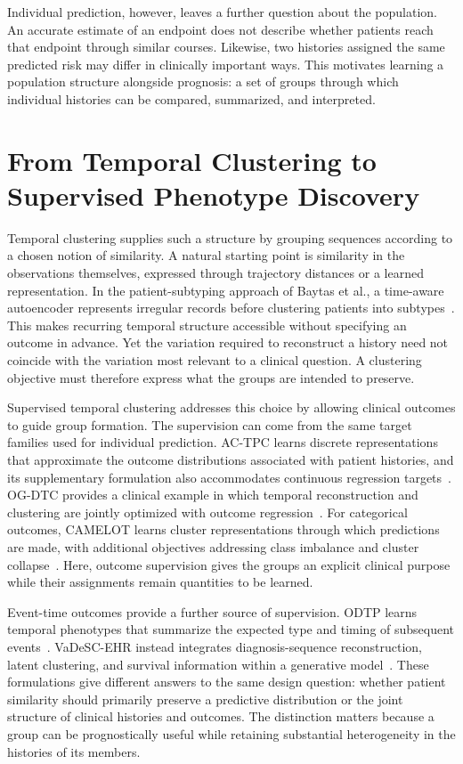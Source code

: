 Individual prediction, however, leaves a further question about the population. An accurate estimate of an endpoint does not describe whether patients reach that endpoint through similar courses. Likewise, two histories assigned the same predicted risk may differ in clinically important ways. This motivates learning a population structure alongside prognosis: a set of groups through which individual histories can be compared, summarized, and interpreted.

\section{From Temporal Clustering to Supervised Phenotype Discovery}

Temporal clustering supplies such a structure by grouping sequences according to a chosen notion of similarity. A natural starting point is similarity in the observations themselves, expressed through trajectory distances or a learned representation. In the patient-subtyping approach of Baytas et al., a time-aware autoencoder represents irregular records before clustering patients into subtypes~\cite{baytas2017tlstm}. This makes recurring temporal structure accessible without specifying an outcome in advance. Yet the variation required to reconstruct a history need not coincide with the variation most relevant to a clinical question. A clustering objective must therefore express what the groups are intended to preserve.

Supervised temporal clustering addresses this choice by allowing clinical outcomes to guide group formation. The supervision can come from the same target families used for individual prediction. AC-TPC learns discrete representations that approximate the outcome distributions associated with patient histories, and its supplementary formulation also accommodates continuous regression targets~\cite{lee2020actpc}. OG-DTC provides a clinical example in which temporal reconstruction and clustering are jointly optimized with outcome regression~\cite{wang2024ogdtc}. For categorical outcomes, CAMELOT learns cluster representations through which predictions are made, with additional objectives addressing class imbalance and cluster collapse~\cite{aguiar2022camelot}. Here, outcome supervision gives the groups an explicit clinical purpose while their assignments remain quantities to be learned.

Event-time outcomes provide a further source of supervision. ODTP learns temporal phenotypes that summarize the expected type and timing of subsequent events~\cite{lee2021odtp}. VaDeSC-EHR instead integrates diagnosis-sequence reconstruction, latent clustering, and survival information within a generative model~\cite{qiu2025vadescehr}. These formulations give different answers to the same design question: whether patient similarity should primarily preserve a predictive distribution or the joint structure of clinical histories and outcomes. The distinction matters because a group can be prognostically useful while retaining substantial heterogeneity in the histories of its members.


